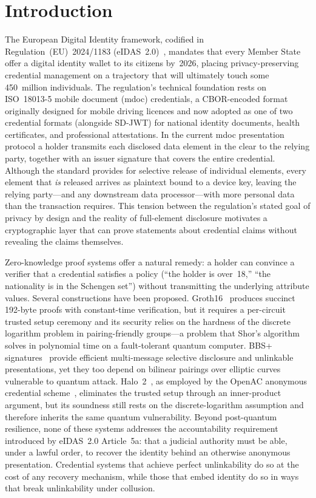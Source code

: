 \section{Introduction}\label{sec:intro}

The European Digital Identity framework, codified in Regulation~(EU)~2024/1183
(eIDAS~2.0)~\cite{eidas2}, mandates that every Member State offer a digital
identity wallet to its citizens by~2026, placing privacy-preserving credential
management on a trajectory that will ultimately touch some 450~million
individuals. The regulation's technical foundation rests on ISO~18013-5 mobile
document (mdoc) credentials, a CBOR-encoded format originally designed for
mobile driving licences and now adopted as one of two credential formats
(alongside SD-JWT) for national identity documents, health certificates, and
professional attestations. In the current mdoc
presentation protocol a holder transmits each disclosed data element in the
clear to the relying party, together with an issuer signature that covers the
entire credential. Although the standard provides for selective release of
individual elements, every element that \emph{is} released arrives as plaintext
bound to a device key, leaving the relying party---and any downstream data
processor---with more personal data than the transaction requires. This tension
between the regulation's stated goal of privacy by design and the reality of
full-element disclosure motivates a cryptographic layer that can prove
statements about credential claims without revealing the claims themselves.

Zero-knowledge proof systems offer a natural remedy: a holder can convince a
verifier that a credential satisfies a policy (``the holder is over~18,'' ``the
nationality is in the Schengen set'') without transmitting the underlying
attribute values. Several constructions have been proposed. Groth16~\cite{groth16}
produces succinct 192-byte proofs with constant-time verification, but it
requires a per-circuit trusted setup ceremony and its security relies on the
hardness of the discrete logarithm problem in pairing-friendly groups---a
problem that Shor's algorithm solves in polynomial time on a fault-tolerant
quantum computer. BBS+ signatures~\cite{bbs} provide efficient multi-message
selective disclosure and unlinkable presentations, yet they too depend on
bilinear pairings over elliptic curves vulnerable to quantum attack.
Halo~2~\cite{halo2}, as employed by the OpenAC anonymous credential
scheme~\cite{openac}, eliminates the trusted setup through an inner-product
argument, but its soundness still rests on the discrete-logarithm assumption
and therefore inherits the same quantum vulnerability. Beyond post-quantum
resilience, none of these systems addresses the accountability requirement
introduced by eIDAS~2.0 Article~5a: that a judicial authority must be able, under
a lawful order, to recover the identity behind an otherwise anonymous
presentation. Credential systems that achieve perfect unlinkability do so at the
cost of any recovery mechanism, while those that embed identity do so in ways
that break unlinkability under collusion.

